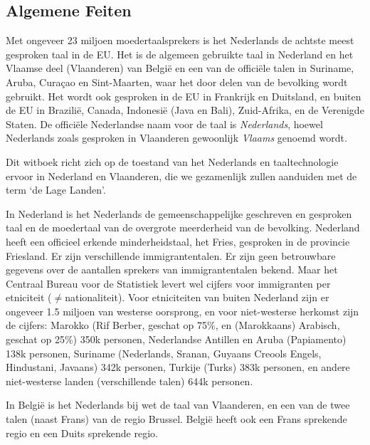 \begin{multicols}{2}

\subsection{Algemene Feiten}

Met ongeveer 23 miljoen moedertaalsprekers is het Nederlands de achtste meest gesproken taal in de EU. Het is de algemeen gebruikte taal in Nederland en het Vlaamse deel (Vlaanderen) van Belgi{\"e} en een van de offici{\"e}le talen in Suriname, Aruba, Cura{\c{c}}ao en Sint-Maarten, waar het door delen van de bevolking wordt gebruikt. Het wordt ook gesproken in de EU in Frankrijk en Duitsland, en buiten de EU in Brazili{\"e}, Canada, Indonesi{\"e} (Java en Bali), Zuid-Afrika, en de Verenigde Staten. De offici{\"e}le Nederlandse naam voor de taal is \emph{Nederlands}, hoewel Nederlands zoals gesproken in Vlaanderen gewoonlijk \emph{Vlaams} genoemd wordt.

    Dit witboek richt zich op de toestand van het Nederlands en taaltechnologie ervoor in Nederland en Vlaanderen, die we gezamenlijk zullen aanduiden met de term `de Lage Landen'.

    In Nederland is het Nederlands de gemeenschappelijke geschreven en gesproken taal en de moedertaal van de overgrote meerderheid van de bevolking. Nederland heeft een officieel erkende minderheidstaal, het Fries, gesproken in de provincie Friesland. Er zijn verschillende immigrantentalen. Er zijn geen betrouwbare gegevens over de aantallen sprekers van immigrantentalen bekend. Maar het Centraal Bureau voor de Statistiek \cite{CBS} levert wel cijfers voor immigranten per etniciteit ($\neq$nationaliteit). Voor etniciteiten van buiten Nederland zijn er ongeveer 1.5 miljoen van westerse oorsprong, en voor niet-westerse herkomst zijn de cijfers: Marokko (Rif Berber, geschat op 75\%, en (Marokkaans) Arabisch, geschat op 25\%) 350k personen, Nederlandse Antillen en Aruba (Papiamento) 138k personen, Suriname (Nederlands, Sranan, Guyaans Creools Engels, Hindustani, Javaans) 342k personen, Turkije (Turks) 383k personen, en andere niet-westerse landen (verschillende talen) 644k personen.


    In Belgi{\"e} is het Nederlands bij wet de taal van Vlaanderen, en een van de twee talen (naast Frans) van de regio Brussel. Belgi{\"e} heeft ook een Frans sprekende regio en een Duits sprekende regio.


\end{multicols}
